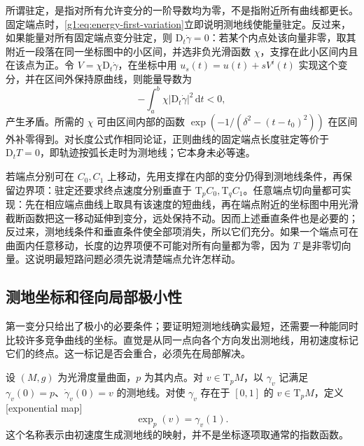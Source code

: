 所谓驻定，是指对所有允许变分的一阶导数均为零，不是指附近所有曲线都更长。固定端点时，\eqref{g1:eq:energy-first-variation}立即说明测地线使能量驻定。反过来，如果能量对所有固定端点变分驻定，则 \(\mathrm{D}_t\dot\gamma=0\)：若某个内点处该向量非零，取其附近一段落在同一坐标图中的小区间，并选非负光滑函数 \(\chi\)，支撑在此小区间内且在该点为正。令 \(V=\chi \mathrm{D}_t\dot\gamma\)，在坐标中用 \(u_s(t)=u(t)+sV^i(t)\) 实现这个变分，并在区间外保持原曲线，则能量导数为
\[
	-\int_a^b\chi|\mathrm{D}_t\dot\gamma|^2\,\mathrm{d}t<0,
\]
产生矛盾。所需的 \(\chi\) 可由区间内部的函数 \(\exp(-1/(\delta^2-(t-t_0)^2))\) 在区间外补零得到。对长度公式作相同论证，正则曲线的固定端点长度驻定等价于 \(\mathrm{D}_tT=0\)，即轨迹按弧长走时为测地线；它本身未必等速。

\ProseParagraphBreak

若端点分别可在 \(C_0,C_1\) 上移动，先用支撑在内部的变分仍得到测地线条件，再保留边界项：驻定还要求终点速度分别垂直于 \(\mathrm{T}_pC_0,\mathrm{T}_qC_1\)。任意端点切向量都可实现：先在相应端点曲线上取具有该速度的短曲线，再在端点附近的坐标图中用光滑截断函数把这一移动延伸到变分，远处保持不动。因而上述垂直条件也是必要的；反过来，测地线条件和垂直条件使全部项消失，所以它们充分。如果一个端点可在曲面内任意移动，长度的边界项便不可能对所有向量都为零，因为 \(T\) 是非零切向量。这说明最短路问题必须先说清楚端点允许怎样动。

\subsection{测地坐标和径向局部极小性}
\label{g1:subsec:0902:04}

第一变分只给出了极小的必要条件；要证明短测地线确实最短，还需要一种能同时比较许多竞争曲线的坐标。直觉是从同一点向各个方向发出测地线，用初速度标记它们的终点。这一标记是否会重合，必须先在局部解决。

\begin{definition}
	\label{g1:def:surface-exponential}
	设 \((M,g)\) 为光滑度量曲面，\(p\) 为其内点。对 \(v\in\mathrm T_pM\)，以 \(\gamma_v\) 记满足 \(\gamma_v(0)=p\)、\(\dot\gamma_v(0)=v\) 的测地线。对使 \(\gamma_v\) 存在于 \([0,1]\) 的 \(v\in \mathrm{T}_pM\)，定义[exponential map]
	\[
		\exp_p(v)=\gamma_v(1).
	\]
	这个名称表示由初速度生成测地线的映射，并不是坐标逐项取通常的指数函数。
\end{definition}


